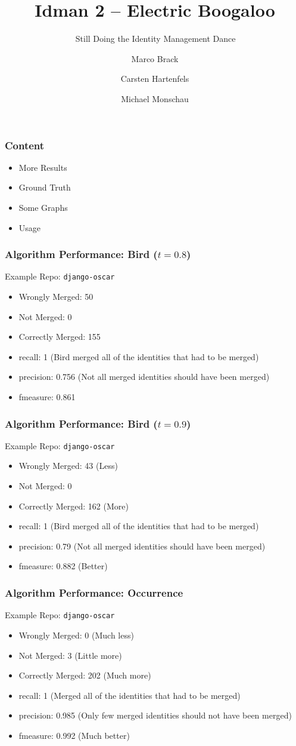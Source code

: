 \documentclass[slidestop,usenames,dvipsnames]{beamer}
\title{Idman 2 -- Electric Boogaloo}
\subtitle{💃\ Still Doing the Identity Management Dance 💃}
\author{Marco Brack \and Carsten Hartenfels \and Michael Monschau}
\newcommand{\gitem}{\vfill\item}
\begin{document}
\begin{frame}
    \titlepage
\end{frame}




\begin{frame}
    \frametitle{Content}
    \begin{itemize}
       \gitem More Results
       \gitem Ground Truth
       \gitem Some Graphs
       \gitem Usage
    \end{itemize}
    \vfill
\end{frame}


\begin{frame}
  \frametitle{Algorithm Performance: Bird ($t=0.8$)}
  Example Repo: \texttt{django-oscar}
  \begin{itemize}
    \gitem Wrongly Merged: 50
    \gitem Not Merged: 0
    \gitem Correctly Merged: 155
  \end{itemize}
  \begin{itemize}
    \gitem recall: 1 (Bird merged all of the identities that had to be merged)
    \gitem precision: 0.756 (Not all merged identities should have been merged)
    \gitem fmeasure: 0.861
  \end{itemize}
  \vfill
\end{frame}


\begin{frame}
  \frametitle{Algorithm Performance: Bird ($t=0.9$)}
  Example Repo: \texttt{django-oscar}
  \begin{itemize}
    \gitem Wrongly Merged: 43 (Less)
    \gitem Not Merged: 0
    \gitem Correctly Merged: 162 (More)
  \end{itemize}
  \begin{itemize}
    \gitem recall: 1 (Bird merged all of the identities that had to be merged)
    \gitem precision: 0.79 (Not all merged identities should have been merged)
    \gitem fmeasure: 0.882 (Better)
  \end{itemize}
  \vfill
\end{frame}


\begin{frame}
  \frametitle{Algorithm Performance: Occurrence}
  Example Repo: \texttt{django-oscar}
  \begin{itemize}
    \gitem Wrongly Merged: 0 (Much less)
    \gitem Not Merged: 3 (Little more)
    \gitem Correctly Merged: 202 (Much more)
  \end{itemize}
  \begin{itemize}
    \gitem recall: 1 (Merged all of the identities that had to be merged)
    \gitem precision: 0.985 (Only few merged identities should not have been merged)
    \gitem fmeasure: 0.992 (Much better)
  \end{itemize}
  \vfill
\end{frame}
\end{document}
